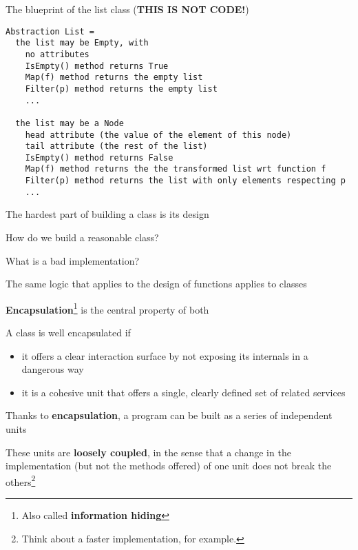 \documentclass{beamer}
\begin{document}
\begin{frame}[fragile]{The blueprint of the list class (\textbf{THIS IS NOT CODE!})}
\begin{lstlisting}
Abstraction List =
  the list may be Empty, with
    no attributes
    IsEmpty() method returns True
    Map(f) method returns the empty list
    Filter(p) method returns the empty list
    ...
    
  the list may be a Node
    head attribute (the value of the element of this node)
    tail attribute (the rest of the list)
    IsEmpty() method returns False
    Map(f) method returns the the transformed list wrt function f
    Filter(p) method returns the list with only elements respecting p
    ...
\end{lstlisting}
\end{frame}

\begin{slide}{
\item The hardest part of building a class is its design
\item How do we build a reasonable class?
\item What is a bad implementation?
}\end{slide}

\begin{slide}{
\item The same logic that applies to the design of functions applies to classes
\item \textbf{Encapsulation}\footnote{Also called \textbf{information hiding}} is the central property of both
\item A class is well encapsulated if 
\begin{itemize}
\item it offers a clear interaction surface by not exposing its internals in a dangerous way
\item it is a cohesive unit that offers a single, clearly defined set of related services
\end{itemize}
}\end{slide}

\begin{slide}{
\item Thanks to \textbf{encapsulation}, a program can be built as a series of independent units
\item These units are \textbf{loosely coupled}, in the sense that a change in the implementation (but not the methods offered) of one unit does not break the others\footnote{Think about a faster implementation, for example.}
}\end{slide}
\end{document}
